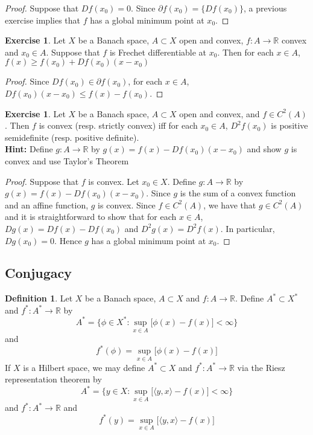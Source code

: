 \documentclass[12pt]{amsart}
\theoremstyle{definition}
\newtheorem{defn}[definition]{Definition}
\newtheorem{ex}[definition]{Exercise}
\newcommand{\R}{\mathbb{R}}
\newcommand{\p}{\partial}
\renewcommand{\r}{\rangle}
\renewcommand{\l}{\langle}
\newcommand{\lex}[1]{\label{ex:#1}}
\newcommand{\ld}[1]{\label{defn:#1}}
\begin{document}
	\begin{proof}
	Suppose that $Df(x_0) = 0$. Since $\p f(x_0) = \{Df(x_0)\}$, a previous exercise implies that $f$ has a global minimum point at $x_0$. 
	\end{proof}
	
	\begin{ex}
	Let $X$ be a Banach space, $A \subset X$ open and convex, $f:A \rightarrow \R$ convex and $x_0 \in A$. Suppose that $f$ is Frechet differentiable at $x_0$. Then for each $x \in A$, $f(x) \geq f(x_0) + Df(x_0)(x - x_0)$
	\end{ex}
	
	\begin{proof}
	Since $Df(x_0) \in \p f(x_0)$, for each $x \in A$, $Df(x_0)(x - x_0) \leq f(x) - f(x_0)$.
	\end{proof}
	
	\begin{ex} \lex{}
	Let $X$ be a Banach space, $A \subset X$ open and convex, and $f \in C^2(A)$. Then $f$ is convex (resp. strictly convex) iff for each $x_0 \in A$, $D^2f(x_0)$ is positive semidefinite (resp. positive definite).\\
	\textbf{Hint:} Define $g:A \rightarrow \R$ by $g(x) = f(x) - Df(x_0)(x - x_0)$ and show $g$ is convex and use Taylor's Theorem
	\end{ex}
	
	\begin{proof}
	Suppose that $f$ is convex. Let $x_0 \in X$. Define $g:A \rightarrow \R$ by $g(x) = f(x) - Df(x_0)(x - x_0)$. Since $g$ is the sum of a convex function and an affine function, $g$ is convex. Since $f \in C^2(A)$, we have that $g \in C^2(A)$ and it is straightforward to show that for each $x \in A$, $Dg(x) = Df(x) - Df(x_0)$ and $D^2g(x) = D^2f(x)$. In particular, $Dg(x_0) = 0$. Hence $g$ has a global minimum point at $x_0$. 
	\end{proof}
	
	\newpage 
	\subsection{Conjugacy}
	
	\begin{defn} \ld{}
	Let $X$ be a Banach space, $A \subset X$ and $f:A \rightarrow \R$. Define $A^* \subset X^*$ and $f^*: A^* \rightarrow \R$ by $$A^* = \bigg \{\phi \in X^*: \sup_{x \in A} \bigg[ \phi(x) - f(x) \bigg] < \infty \bigg  \}$$ and $$f^*(\phi) = \sup_{x \in A} \bigg[ \phi(x) - f(x) \bigg] $$ 
	If $X$ is a Hilbert space, we may define $A^* \subset X$ and $f^*: A^* \rightarrow \R$ via the Riesz representation theorem by $$A^* = \bigg \{y \in X: \sup_{x \in A} \bigg[ \l y, x \r - f(x) \bigg] < \infty \bigg  \}$$ and $f^*: A^* \rightarrow \R$ and $$ f^*(y) = \sup_{x \in A} \bigg[ \l y, x \r - f(x) \bigg] $$
	\end{defn} 
	
\end{document}
